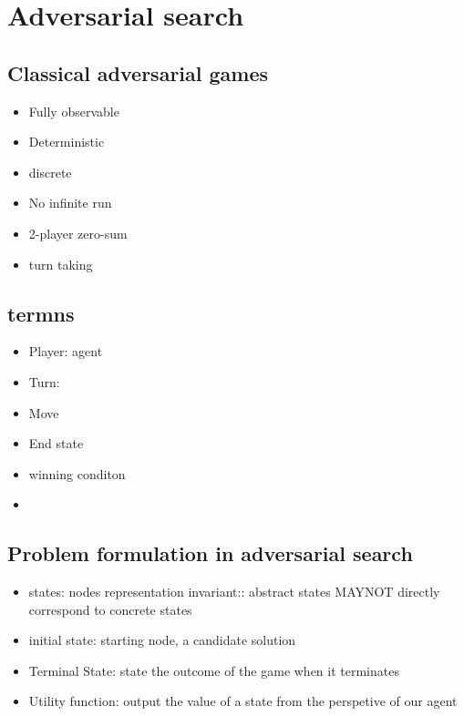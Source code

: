 \documentclass{article}
\begin{document}
\section{Adversarial search}
\subsection{Classical adversarial games}
\begin{itemize}
    \item Fully observable
    \item Deterministic
    \item discrete
    \item No infinite run
    \item 2-player zero-sum
    \item turn taking
\end{itemize}
\subsection*{termns}
\begin{itemize}
    \item Player: agent
    \item Turn: 
    \item Move
    \item End state
    \item winning conditon
    \item 
\end{itemize}
\subsection{Problem formulation in adversarial search}
        \begin{itemize}
            \item states: nodes representation invariant:: abstract states MAYNOT directly correspond to concrete states
            \item initial state: starting node, a candidate solution
            \item Terminal State: state the outcome of the game when it terminates
            \item Utility function: output the value of a state from the perspetive of our agent 
        \end{itemize}
\end{document}
